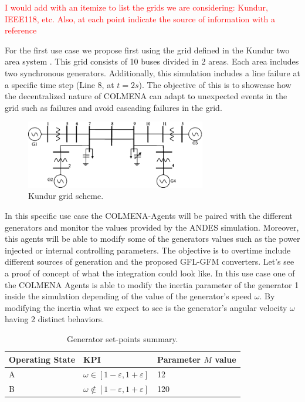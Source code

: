 \documentclass{article}
\begin{document}
\textcolor{red}{I would add with an itemize to list the grids we are considering: Kundur, IEEE118, etc. Also, at each point indicate the source of information with a reference}

For the first use case we propose first using the grid defined in the Kundur two area system  \cite{grids:kundur}. This grid consists of 10 buses divided in 2 areas. Each area includes two synchronous generators. Additionally, this simulation includes a line failure at a specific time step (Line 8, at $t=2s$). The objective of this is to showcase how the decentralized nature of COLMENA can adapt to unexpected events in the grid such as failures and avoid cascading failures in the grid. 

\begin{figure}[!htb]
    \centering
    \includegraphics[width=0.7\textwidth]{pictures/kundurgrid.png}
    \caption{Kundur grid scheme. \cite{grids:kundur}}
    \label{fig:kundur2}
\end{figure}

In this specific use case the COLMENA-Agents will be paired with the different generators and monitor the values provided by the ANDES simulation. Moreover, this agents will be able to modify some of the generators values such as the power injected or internal controlling parameters. The objective is to overtime include different sources of generation and the proposed GFL-GFM converters. Let's see a proof of concept of what the integration could look like. In this use case one of the COLMENA Agents is able to modify the inertia parameter of the generator 1 inside the simulation depending of the value of the generator's speed $\omega$. By modifying the inertia what we expect to see is the generator's angular velocity $\omega$ having 2 distinct behaviors.  

\begin{table}[H]
    \centering
    \begin{tabular}{|l|l|l|}
    \hline
    Operating State & KPI                              & Parameter $M$ value \\ \hline
    A               & $\omega \in [1 - \varepsilon, 1 + \varepsilon]$ & 12  \\ \hline
    B               & $\omega \notin [1 - \varepsilon, 1 + \varepsilon]$ & 120               \\ \hline
    \end{tabular}
    \caption{Generator set-points summary.}
\end{table}
  
\end{document}
